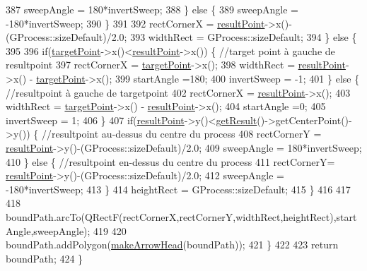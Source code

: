 \begin{DoxyCode}
387                 sweepAngle = 180*invertSweep;
388             \} \textcolor{keywordflow}{else} \{
389                 sweepAngle = -180*invertSweep;
390             \}
391 
392             rectCornerX = \hyperlink{classGAction_a08d6b4a2f2d04a46861dafbe38897d8a}{resultPoint}->x()- (GProcess::sizeDefault)/2.0;
393             widthRect = GProcess::sizeDefault;
394         \} \textcolor{keywordflow}{else} \{
395 
396             \textcolor{keywordflow}{if}(\hyperlink{classGAction_ad6992ac8b540932c370f5b46c48bbe70}{targetPoint}->x()<\hyperlink{classGAction_a08d6b4a2f2d04a46861dafbe38897d8a}{resultPoint}->x()) \{ \textcolor{comment}{//target point à gauche de
       resultpoint}
397                 rectCornerX = \hyperlink{classGAction_ad6992ac8b540932c370f5b46c48bbe70}{targetPoint}->x();
398                 widthRect = \hyperlink{classGAction_a08d6b4a2f2d04a46861dafbe38897d8a}{resultPoint}->x() - \hyperlink{classGAction_ad6992ac8b540932c370f5b46c48bbe70}{targetPoint}->x();
399                 startAngle =180;
400                 invertSweep = -1;
401             \} \textcolor{keywordflow}{else} \{ \textcolor{comment}{//resultpoint à gauche de targetpoint}
402                 rectCornerX = \hyperlink{classGAction_a08d6b4a2f2d04a46861dafbe38897d8a}{resultPoint}->x();
403                 widthRect = \hyperlink{classGAction_ad6992ac8b540932c370f5b46c48bbe70}{targetPoint}->x() - \hyperlink{classGAction_a08d6b4a2f2d04a46861dafbe38897d8a}{resultPoint}->x();
404                 startAngle =0;
405                 invertSweep = 1;
406             \}
407             \textcolor{keywordflow}{if}(\hyperlink{classGAction_a08d6b4a2f2d04a46861dafbe38897d8a}{resultPoint}->y()<\hyperlink{classGAction_ae1ed003118c8333c6afa2e8d30e3dc07}{getResult}()->getCenterPoint()->y()) \{ \textcolor{comment}{//resultpoint
       au-dessus du centre du process}
408                 rectCornerY = \hyperlink{classGAction_a08d6b4a2f2d04a46861dafbe38897d8a}{resultPoint}->y()-(GProcess::sizeDefault)/2.0;
409                 sweepAngle = 180*invertSweep;
410             \} \textcolor{keywordflow}{else} \{ \textcolor{comment}{//resultpoint en-dessus du centre du process}
411                 rectCornerY= \hyperlink{classGAction_a08d6b4a2f2d04a46861dafbe38897d8a}{resultPoint}->y()-(GProcess::sizeDefault)/2.0;
412                 sweepAngle = -180*invertSweep;
413             \}
414             heightRect = GProcess::sizeDefault;
415         \}
416 
417 
418         boundPath.arcTo(QRectF(rectCornerX,rectCornerY,widthRect,heightRect),startAngle,sweepAngle);
419 
420         boundPath.addPolygon(\hyperlink{classGAction_a7144bb80f0de787a60d43340c8545163}{makeArrowHead}(boundPath));
421     \}
422 
423     \textcolor{keywordflow}{return} boundPath;
424 \}
\end{DoxyCode}
